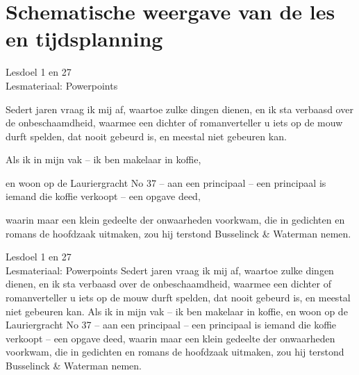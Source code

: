 
\section{Schematische weergave van de les en tijdsplanning}
\lesschematitel

\begin{lesdeel}{
    Lesdoel 1 en 27 \\
    Lesmateriaal: Powerpoints
}
    \vspace{-3.5mm}
    \begin{schemalist}
        \item{Sedert jaren vraag ik mij af, waartoe zulke dingen dienen, en ik sta verbaasd over de onbeschaamdheid, waarmee een dichter of romanverteller u iets op de mouw durft spelden, dat nooit gebeurd is, en meestal niet gebeuren kan.}
        \item{Als ik in mijn vak -- ik ben makelaar in koffie, }
        \item{en woon op de Lauriergracht No 37 -- aan een principaal -- een principaal is iemand die koffie verkoopt -- een opgave deed, }
        \item{waarin maar een klein gedeelte der onwaarheden voorkwam, die in gedichten en romans de hoofdzaak uitmaken, zou hij terstond Busselinck \& Waterman nemen.}
    \end{schemalist}
\end{lesdeel}%


\begin{lesdeel}{
    Lesdoel 1 en 27 \\
    Lesmateriaal: Powerpoints
}
    Sedert jaren vraag ik mij af, waartoe zulke dingen dienen, en ik sta verbaasd over de onbeschaamdheid, waarmee een dichter of romanverteller u iets op de mouw durft spelden, dat nooit gebeurd is, en meestal niet gebeuren kan.
    Als ik in mijn vak -- ik ben makelaar in koffie, en woon op de Lauriergracht No 37 -- aan een principaal -- een principaal is iemand die koffie verkoopt -- een opgave deed, waarin maar een klein gedeelte der onwaarheden voorkwam, die in gedichten en romans de hoofdzaak uitmaken, zou hij terstond Busselinck \& Waterman nemen.
\end{lesdeel}%

